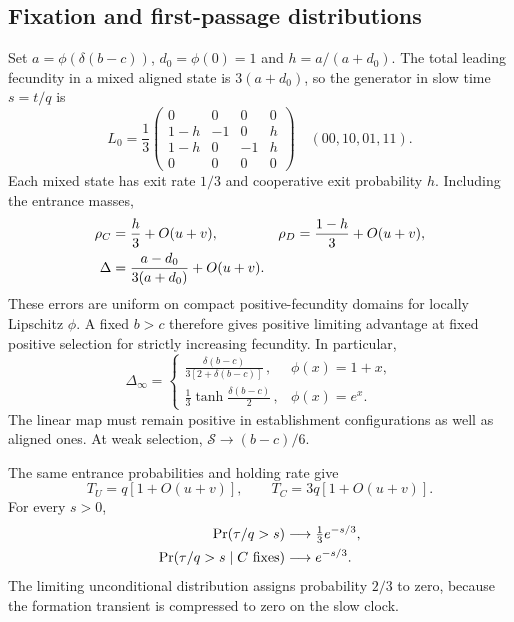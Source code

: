 \documentclass[aps,pre,reprint,amsmath,amssymb,longbibliography]{revtex4-2}
\begin{document}
\subsection{Fixation and first-passage distributions}
\label{sec:finite-selection}\label{sec:domain-times}
Set $a=\phi(\delta(b-c))$, $d_0=\phi(0)=1$ and $h=a/(a+d_0)$.
The total leading fecundity in a mixed aligned state is $3(a+d_0)$,
so the generator in slow time $s=t/q$ is
\begin{equation}
 L_0=\frac13
 \begin{pmatrix}
 0&0&0&0\\
 1-h&-1&0&h\\
 1-h&0&-1&h\\
 0&0&0&0
 \end{pmatrix}
 \quad (00,10,01,11).
 \label{eq:domain-generator}
\end{equation}
Each mixed state has exit rate $1/3$ and cooperative exit probability
$h$. Including the entrance masses,
\begin{align}
 \rho_C&=\frac h3+O(u+v),&
 \rho_D&=\frac{1-h}{3}+O(u+v),\notag\\
 \Delta&=\frac{a-d_0}{3(a+d_0)}+O(u+v).
 \label{eq:p6-selected}
\end{align}
These errors are uniform on compact positive-fecundity domains for
locally Lipschitz $\phi$. A fixed $b>c$ therefore gives positive
limiting advantage at fixed positive selection for strictly increasing
fecundity. In particular,
\begin{equation}
 \Delta_\infty=
 \begin{cases}
 \displaystyle\frac{\delta(b-c)}{3[2+\delta(b-c)]}\,,
       &\phi(x)=1+x,\\[2mm]
 \displaystyle\frac13\tanh\!\frac{\delta(b-c)}2\,,
       &\phi(x)=e^x.
 \end{cases}
 \label{eq:selected-maps}
\end{equation}
The linear map must remain positive in establishment configurations as
well as aligned ones. At weak selection, $\mathcal S\to(b-c)/6$.

The same entrance probabilities and holding rate give
\begin{equation}
 T_U=q[1+O(u+v)],\qquad
 T_C=3q[1+O(u+v)] .
 \label{eq:p6-times}
\end{equation}
For every $s>0$,
\begin{align}
 \Pr(\tau/q>s)&\longrightarrow\tfrac13e^{-s/3},\notag\\
 \Pr(\tau/q>s\mid C\text{ fixes})&\longrightarrow e^{-s/3}.
 \label{eq:p6-tails}
\end{align}
The limiting unconditional distribution assigns probability $2/3$
to zero, because the formation transient is compressed to zero on the slow clock.
\end{document}

